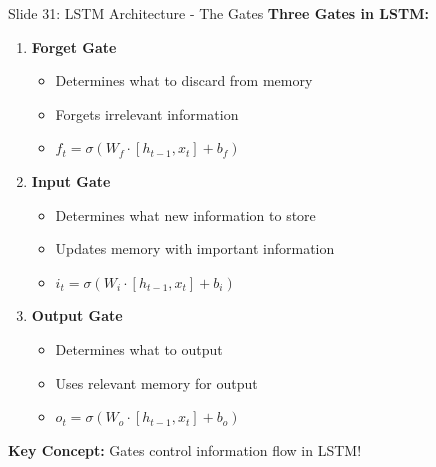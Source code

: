 \documentclass[8pt]{beamer}
\begin{document}
	\begin{frame}{Slide 31: LSTM Architecture - The Gates}
		\fontsize{6.5}{7.5}\selectfont
		\textbf{Three Gates in LSTM:}
		\begin{enumerate}
			\item \textbf{Forget Gate}
			\begin{itemize}
				\item Determines what to discard from memory
				\item Forgets irrelevant information
				\item $f_t = \sigma(W_f \cdot [h_{t-1}, x_t] + b_f)$
			\end{itemize}
			\item \textbf{Input Gate}
			\begin{itemize}
				\item Determines what new information to store
				\item Updates memory with important information
				\item $i_t = \sigma(W_i \cdot [h_{t-1}, x_t] + b_i)$
			\end{itemize}
			\item \textbf{Output Gate}
			\begin{itemize}
				\item Determines what to output
				\item Uses relevant memory for output
				\item $o_t = \sigma(W_o \cdot [h_{t-1}, x_t] + b_o)$
			\end{itemize}
		\end{enumerate}
		
		\textcolor{myblue}{\textbf{Key Concept:}} Gates control information flow in LSTM!
	\end{frame}
	
\end{document}
